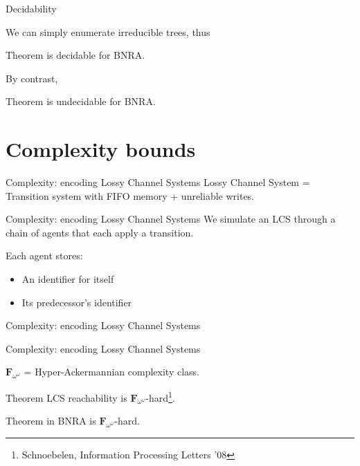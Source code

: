 \documentclass{beamer}
\begin{document}
\begin{frame}{Decidability}
	
	We can simply enumerate irreducible trees, thus
	
	\begin{block}{Theorem}
		{} is decidable for BNRA.
	\end{block}
	
	\pause
	
	By contrast,
	
	\begin{block}{Theorem}
		{} is undecidable for BNRA.
	\end{block}
\end{frame}

\section{Complexity bounds}

\begin{frame}{Complexity: encoding Lossy Channel Systems}
	Lossy Channel System = Transition system with FIFO memory + unreliable writes.\vspace{1cm}
	
	
\end{frame}


\begin{frame}{Complexity: encoding Lossy Channel Systems}
	We simulate an LCS through a chain of agents that each apply a transition.
	
	Each agent stores:
	\begin{itemize}
		\item An identifier for itself
		
		\item Its predecessor's identifier
	\end{itemize} 
	
	
	
\end{frame}


\begin{frame}{Complexity: encoding Lossy Channel Systems}
	
	
	
\end{frame}

\begin{frame}{Complexity: encoding Lossy Channel Systems}
	
	$\mathbf{F}_{\omega^\omega}$ = Hyper-Ackermannian complexity class.
	
	\begin{block}{Theorem}
		LCS reachability is $\mathbf{F}_{\omega^\omega}$-hard\footnote{Schnoebelen, Information Processing Letters '08}.
	\end{block}
	
	\begin{block}{Theorem}
		{} in BNRA is $\mathbf{F}_{\omega^\omega}$-hard.
	\end{block}
	
\end{frame}
\end{document}
